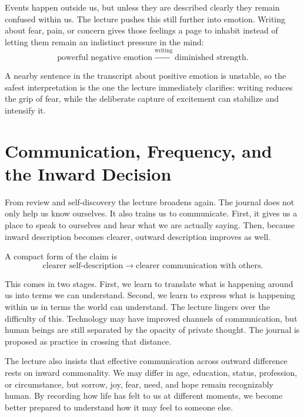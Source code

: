 Events happen outside us, but unless they are described clearly they remain confused within us. The lecture pushes this still further into emotion. Writing about fear, pain, or concern gives those feelings a page to inhabit instead of letting them remain an indistinct pressure in the mind:
\begin{equation}
\text{powerful negative emotion}\xrightarrow{\text{writing}}\text{diminished strength}.
\end{equation}

A nearby sentence in the transcript about positive emotion is unstable, so the safest interpretation is the one the lecture immediately clarifies: writing reduces the grip of fear, while the deliberate capture of excitement can stabilize and intensify it.

\section{Communication, Frequency, and the Inward Decision}

From review and self-discovery the lecture broadens again. The journal does not only help us know ourselves. It also trains us to communicate. First, it gives us a place to speak to ourselves and hear what we are actually saying. Then, because inward description becomes clearer, outward description improves as well.

A compact form of the claim is
\begin{equation}
\text{clearer self-description}\rightarrow \text{clearer communication with others}.
\end{equation}

This comes in two stages. First, we learn to translate what is happening around us into terms we can understand. Second, we learn to express what is happening within us in terms the world can understand. The lecture lingers over the difficulty of this. Technology may have improved channels of communication, but human beings are still separated by the opacity of private thought. The journal is proposed as practice in crossing that distance.

The lecture also insists that effective communication across outward difference rests on inward commonality. We may differ in age, education, status, profession, or circumstance, but sorrow, joy, fear, need, and hope remain recognizably human. By recording how life has felt to us at different moments, we become better prepared to understand how it may feel to someone else.

